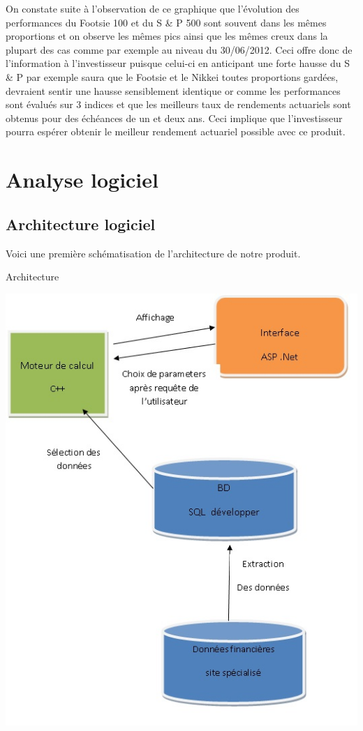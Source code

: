\documentclass[french,12pt,a4paper]{article}
\begin{document}
On constate suite à l'observation de ce graphique que l'évolution des performances du Footsie 100 et du S \& P 500 sont souvent dans les mêmes proportions et on observe les mêmes pics ainsi que les mêmes creux dans la plupart des cas comme par exemple au niveau du 30/06/2012.
Ceci offre donc de l'information à l'investisseur puisque celui-ci en anticipant une forte hausse du S \& P par exemple saura que le Footsie et le Nikkei toutes proportions gardées, devraient sentir une hausse sensiblement identique or comme les performances sont évalués sur 3 indices et que les meilleurs taux de rendements actuariels sont obtenus pour des échéances de un et deux ans. Ceci implique que l'investisseur pourra espérer obtenir le meilleur rendement actuariel possible avec ce produit.

\newpage

\section{Analyse logiciel}

\subsection{Architecture logiciel}

Voici une première schématisation de l'architecture de notre produit.

\begin{center}
\caption{Architecture}
\end{center}

\begin{center}
\includegraphics[scale=0.5]{graphe.jpg}
\end{center}
\end{document}
